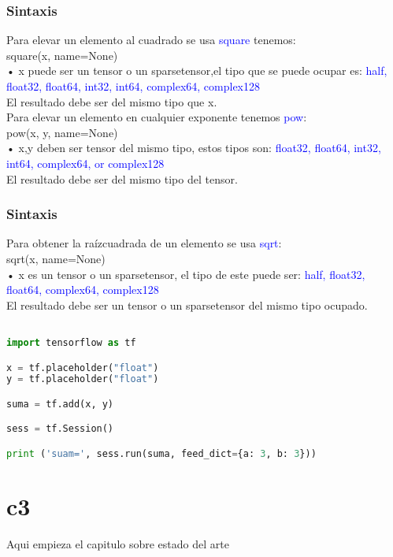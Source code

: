 \documentclass{beamer}
\begin{document}
\newpage
\begin{frame}\frametitle{Sintaxis}
\begin{footnotesize}
Para elevar un elemento al cuadrado se usa \textcolor{blue}{square} tenemos:\\
square(x, name=None)\\ \vspace{2.5mm}
• x puede ser un tensor o un sparsetensor,el tipo que se puede ocupar es: \textcolor{blue}{half,
float32, float64, int32, int64, complex64, complex128}\\
El resultado debe ser del mismo tipo que x.\\ \vspace{5mm}
Para elevar un elemento en cualquier exponente tenemos \textcolor{blue}{pow}:\\
pow(x, y, name=None)\\ \vspace{2.5mm}
• x,y deben ser tensor del mismo tipo, estos tipos son: \textcolor{blue}{float32, float64, int32,
int64, complex64, or complex128}\\
El resultado debe ser del mismo tipo del tensor.
\end{footnotesize}
\end{frame}

\newpage
\begin{frame}\frametitle{Sintaxis}
Para obtener la raízcuadrada de un elemento se usa \textcolor{blue}{sqrt}:\\
sqrt(x, name=None)\\ \vspace{2.5mm}
• x es un tensor o un sparsetensor, el tipo de este puede ser: \textcolor{blue}{half,
float32, float64, complex64, complex128}\\
El resultado debe ser un tensor o un sparsetensor del mismo tipo
ocupado.
\end{frame}

\newpage
\begin{footnotesize}
\begin{lstlisting}[language=Python]

import tensorflow as tf

x = tf.placeholder("float")
y = tf.placeholder("float")

suma = tf.add(x, y)

sess = tf.Session()

print ('suam=', sess.run(suma, feed_dict={a: 3, b: 3}))

\end{lstlisting}
\end{footnotesize}

\newpage
\section{c3}
Aqui empieza el capitulo sobre estado del arte
\end{document}
